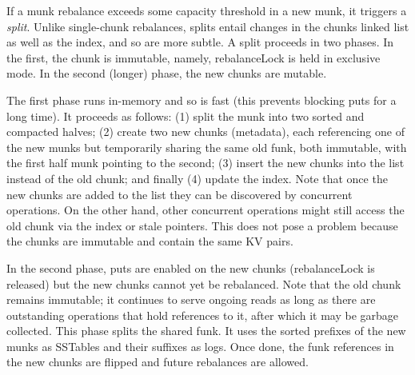
If a munk rebalance exceeds some capacity threshold in a new munk, it triggers a \emph{split}. Unlike 
single-chunk rebalances, splits entail changes in the chunks linked list as well as the index, and so are more subtle. 
A split proceeds in two phases. In the first, the chunk is immutable, namely,  rebalanceLock is held in exclusive mode. In the second (longer) phase, the new chunks are mutable.

The first phase runs in-memory and so is fast (this prevents blocking puts for a long time). 
It proceeds as follows: 
(1) split the munk into two sorted and compacted halves; 
(2) create two new chunks (metadata), each referencing one of the new munks but temporarily sharing the same old funk, both immutable, with the first half munk pointing to the second; 
(3) insert the new chunks into the list instead of the old chunk; and finally  
(4) update the index.
Note that once the new chunks are added to the list they can be discovered by concurrent operations.
On the other hand, other concurrent operations might still access the  old chunk via the index or stale pointers. 
This does not pose a problem because the chunks are immutable and contain the same KV pairs. 

In the second phase, puts are enabled on the new chunks (rebalanceLock is released)
but the new chunks cannot yet be rebalanced. 
Note that the old chunk remains immutable; it continues to serve ongoing reads as long as 
there are outstanding operations that hold references to it, after which it may be  garbage collected.
This phase splits the shared funk. It uses the sorted prefixes of the new munks as SSTables and their 
suffixes as  logs. Once done, the funk references in the new chunks are flipped and future rebalances are allowed.




